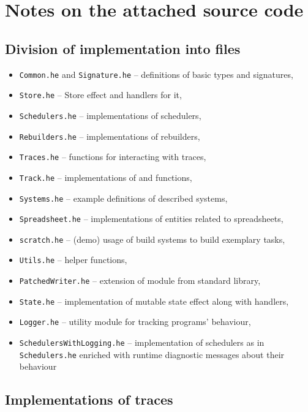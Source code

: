 
\newcommand{\file}[1]{\texttt{#1}}

\chapter{Notes on the attached source code}

\section{Division of implementation into files}

\begin{itemize}
\item \file{Common.he} and \file{Signature.he} -- definitions of basic types and signatures,
\item \file{Store.he} -- Store effect and handlers for it,
\item \file{Schedulers.he} -- implementations of schedulers,
\item \file{Rebuilders.he} -- implementations of rebuilders,
\item \file{Traces.he} -- functions for interacting with traces,
\item \file{Track.he} -- implementations of  and  functions,
\item \file{Systems.he} -- example definitions of described systems,
\item \file{Spreadsheet.he} -- implementations of entities related to spreadsheets,
\item \file{scratch.he} -- (demo) usage of build systems to build exemplary tasks,
\item \file{Utils.he} -- helper functions,
\item \file{PatchedWriter.he} -- extension of  module from standard library,
\item \file{State.he} -- implementation of mutable state effect along with handlers,
\item \file{Logger.he} -- utility module for tracking programs' behaviour,
\item \file{SchedulersWithLogging.he} -- implementation of schedulers as in \file{Schedulers.he} enriched with runtime diagnostic messages about their behaviour
\end{itemize}

\section{Implementations of traces}

